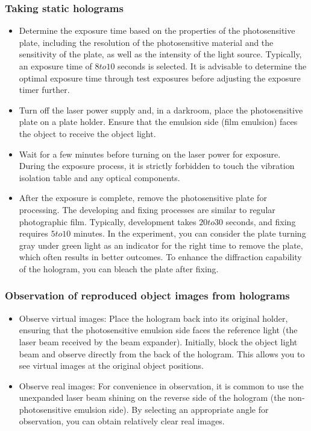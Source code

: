 \documentclass[UTF8]{article}
\begin{document}
    \subsubsection{Taking static holograms}
    \begin{itemize}
      \item Determine the exposure time based on the properties of the photosensitive plate, including the resolution of the photosensitive material and the sensitivity of the plate, as well as the intensity of the light source. Typically, an exposure time of $8 to 10$ seconds is selected. It is advisable to determine the optimal exposure time through test exposures before adjusting the exposure timer further.
    
      \item Turn off the laser power supply and, in a darkroom, place the photosensitive plate on a plate holder. Ensure that the emulsion side (film emulsion) faces the object to receive the object light.
    
      \item Wait for a few minutes before turning on the laser power for exposure. During the exposure process, it is strictly forbidden to touch the vibration isolation table and any optical components.
    
      \item After the exposure is complete, remove the photosensitive plate for processing. The developing and fixing processes are similar to regular photographic film. Typically, development takes $20 to 30$ seconds, and fixing requires $5 to 10$ minutes. In the experiment, you can consider the plate turning gray under green light as an indicator for the right time to remove the plate, which often results in better outcomes. To enhance the diffraction capability of the hologram, you can bleach the plate after fixing.
    \end{itemize}
    
    \subsubsection{Observation of reproduced object images from holograms}
    \begin{itemize}
      \item Observe virtual images: Place the hologram back into its original holder, ensuring that the photosensitive emulsion side faces the reference light (the laser beam received by the beam expander). Initially, block the object light beam and observe directly from the back of the hologram. This allows you to see virtual images at the original object positions.
    
      \item Observe real images: For convenience in observation, it is common to use the unexpanded laser beam shining on the reverse side of the hologram (the non-photosensitive emulsion side). By selecting an appropriate angle for observation, you can obtain relatively clear real images.
    \end{itemize}
    
\end{document}
